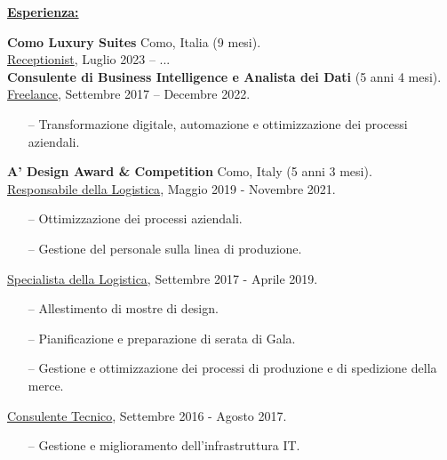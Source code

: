 \documentclass[a4paper,10pt,fullpage]{article}
\begin{document}
\begin{center}
	\underline{\textbf{\large Esperienza:}}
\end{center}	

\textbf{Como Luxury Suites} Como, Italia (9 mesi).\\
\underline{Receptionist}, Luglio 2023 – ...\\

\textbf{Consulente di Business Intelligence e Analista dei Dati} (5 anni 4 mesi).\\
\underline{Freelance}, Settembre 2017 – Decembre 2022.
\begin{itemize}
	\item[--] Transformazione digitale, automazione e ottimizzazione dei processi aziendali.\\
\end{itemize}


\textbf{A' Design Award \& Competition} Como, Italy (5 anni 3 mesi).\\
\underline{Responsabile della Logistica}, Maggio 2019 - Novembre 2021.
\begin{itemize}
	\item[--] Ottimizzazione dei processi aziendali.	
	\item[--] Gestione del personale sulla linea di produzione.
\end{itemize}
\underline{Specialista della Logistica}, Settembre 2017 - Aprile 2019.
\begin{itemize}
	\item[--] Allestimento di mostre di design.
	\item[--] Pianificazione e preparazione di serata di Gala.
	\item[--] Gestione e ottimizzazione dei processi di produzione e di spedizione della merce.
\end{itemize}
\underline{Consulente Tecnico}, Settembre 2016 - Agosto 2017.
\begin{itemize}
	\item[--] Gestione e miglioramento dell'infrastruttura IT.\\
\end{itemize}
\end{document}
